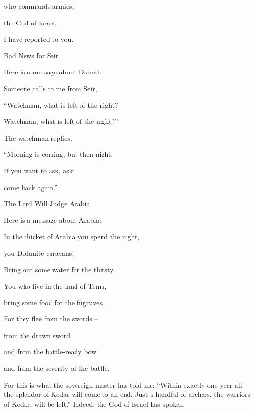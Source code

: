 {{}
who commands armies,
\par }{\Q the God
of Israel,
\par }{\Q I have reported to you.
\par }{\SH Bad News for Seir
\par }{\Q {}Here is a message
about Dumah:

\par }{\Q Someone calls
to me
from Seir,
\par }{\Q “Watchman,
what
is left of the night?
\par }{\Q Watchman,
what
is left of the night?”
\par }{\Q {}The watchman
replies,
\par }{\Q “Morning
is coming,
but then night.
\par }{\Q If
you want to ask,
ask;
\par }{\Q come
back again.”
\par }{\SH The Lord Will Judge Arabia
\par }{\Q {}Here is a message
about Arabia:
\par }{\Q In the thicket
of Arabia
you spend
the night,
\par }{\Q you Dedanite
caravans.
\par }{\Q {}Bring out
some water
for the thirsty.
\par }{\Q You who live
in the land
of Tema,
\par }{\Q bring
some food
for the fugitives.
\par }{\Q {}For
they flee from the swords
–
\par }{\Q from the drawn sword
\par }{\Q and from the battle-ready
bow
\par }{\Q and from the severity
of the battle.
\par }{\PP {}For
this is what
the sovereign
master has told me: “Within
exactly one year
all
the splendor
of Kedar
will come to an end.
Just a handful
of archers,
the warriors
of Kedar,
will be left.”
Indeed,
the {}
God
of Israel
has spoken.

\par }

